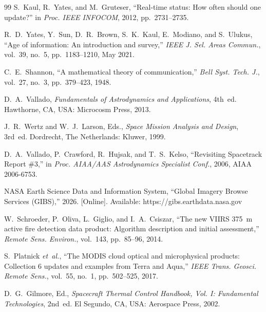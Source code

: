 \documentclass[conference]{IEEEtran}
\theoremstyle{remark}
\begin{document}
\begin{thebibliography}{99}
S.~Kaul, R.~Yates, and M.~Gruteser, ``Real-time status: How often should one update?'' in \emph{Proc. IEEE INFOCOM}, 2012, pp.~2731--2735.

R.~D.~Yates, Y.~Sun, D.~R.~Brown, S.~K.~Kaul, E.~Modiano, and S.~Ulukus, ``Age of information: An introduction and survey,'' \emph{IEEE J. Sel. Areas Commun.}, vol.~39, no.~5, pp.~1183--1210, May 2021.

C.~E.~Shannon, ``A mathematical theory of communication,'' \emph{Bell Syst. Tech. J.}, vol.~27, no.~3, pp.~379--423, 1948.

D.~A.~Vallado, \emph{Fundamentals of Astrodynamics and Applications}, 4th~ed. Hawthorne, CA, USA: Microcosm Press, 2013.

J.~R.~Wertz and W.~J.~Larson, Eds., \emph{Space Mission Analysis and Design}, 3rd~ed. Dordrecht, The Netherlands: Kluwer, 1999.

D.~A.~Vallado, P.~Crawford, R.~Hujsak, and T.~S.~Kelso, ``Revisiting Spacetrack Report \#3,'' in \emph{Proc. AIAA/AAS Astrodynamics Specialist Conf.}, 2006, AIAA 2006-6753.

NASA Earth Science Data and Information System, ``Global Imagery Browse Services (GIBS),'' 2026. [Online]. Available: https://gibs.earthdata.nasa.gov

W.~Schroeder, P.~Oliva, L.~Giglio, and I.~A.~Csiszar, ``The new VIIRS 375~m active fire detection data product: Algorithm description and initial assessment,'' \emph{Remote Sens. Environ.}, vol.~143, pp.~85--96, 2014.

S.~Platnick \emph{et~al.}, ``The MODIS cloud optical and microphysical products: Collection 6 updates and examples from Terra and Aqua,'' \emph{IEEE Trans. Geosci. Remote Sens.}, vol.~55, no.~1, pp.~502--525, 2017.

D.~G.~Gilmore, Ed., \emph{Spacecraft Thermal Control Handbook, Vol. I: Fundamental Technologies}, 2nd~ed. El Segundo, CA, USA: Aerospace Press, 2002.
\end{thebibliography}
\end{document}
